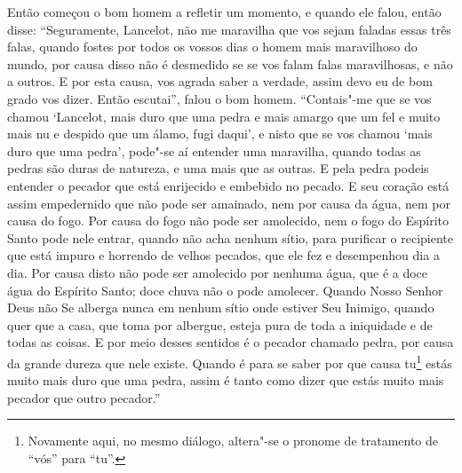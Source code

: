 Então começou o bom homem a refletir um momento, e quando ele falou, então
disse: “Seguramente, Lancelot, não me maravilha que vos sejam faladas essas
três falas, quando fostes por todos os vossos dias o homem mais maravilhoso do
mundo, por causa disso não é desmedido se se vos falam falas maravilhosas, e
não a outros. E por esta causa, vos agrada saber a verdade, assim devo eu de
bom grado vos dizer. Então escutai”, falou o bom homem. “Contais"-me que se vos
chamou ‘Lancelot, mais duro que uma pedra e mais amargo que um fel e muito
mais nu e despido que um álamo, fugi daqui’, e nisto que se vos chamou ‘mais
duro que uma pedra’, pode"-se aí entender uma maravilha, quando todas as pedras
são duras de natureza, e uma mais que as outras. E pela pedra podeis entender o
pecador que está enrijecido e embebido no pecado. E seu coração está assim
empedernido que não pode ser amainado, nem por causa da água, nem por causa do
fogo. Por causa do fogo não pode ser amolecido, nem o fogo do Espírito Santo
pode nele entrar, quando não acha nenhum sítio, para purificar o recipiente que
está impuro e horrendo de velhos pecados, que ele fez e desempenhou dia a dia.
Por causa disto não pode ser amolecido por nenhuma água,  que é a doce água do
Espírito Santo; doce chuva não o pode amolecer. Quando Nosso Senhor Deus não Se
alberga nunca em nenhum sítio onde estiver Seu Inimigo, quando quer que a casa,
que toma por albergue, esteja pura de toda a iniquidade e de todas as coisas. E
por meio desses sentidos é o pecador chamado pedra, por causa da grande dureza
que nele existe. Quando é para se saber por que causa tu\footnote{ Novamente
aqui, no mesmo diálogo, altera"-se o pronome de tratamento de “vós”
 para “tu”.}  estás muito mais duro que
uma pedra, assim é tanto como dizer que estás muito mais pecador que outro
pecador.” 

